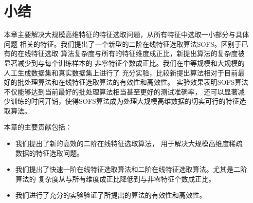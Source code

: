\section{小结}
本章主要解决大规模高维特征的特征选取问题，从所有特征中选取一小部分与具体问题
相关的特征。我们提出了一个新型的二阶在线特征选取算法SOFS。区别于已有的在线特征选取
算法复杂度与所有的特征维度成正比，新提出算法的复杂度被显著减少到与每个训练样本的
非零特征个数成正比。我们在中等规模和大规模的人工生成数据集和真实数据集上进行了
充分实验，比较新提出算法相对于目前最好的批处理算法和在线特征选取算法的有效性和高效性。
实验效果表明SOFS算法不仅能够达到当前最好的批处理算法相当甚至更好的测试准确率，
还可以显著减少训练的时间开销，使得SOFS算法成为处理大规模高维数据的切实可行的特征选取算法。

本章的主要贡献包括：
\begin{itemize}
    \item 我们提出了新的高效的二阶在线特征选取算法，
        用于解决大规模高维度稀疏数据的特征选取问题。
    \item 我们提出了快速一阶在线特征选取算法和二阶在线特征选取算法。尤其是二阶算法的
        复杂度从与所有维度成正比降低到与非零特征个数成正比。
    \item 我们进行了充分的实验验证了所提出的算法的有效性和高效性。
\end{itemize}


